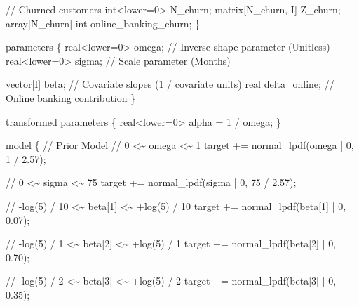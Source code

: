 \documentclass[
  letterpaper,
  DIV=11,
  numbers=noendperiod]{scrartcl}
\newenvironment{Shaded}{\begin{snugshade}}{\end{snugshade}}
\newcommand{\CommentTok}[1]{\textcolor[rgb]{0.37,0.37,0.37}{#1}}
\newcommand{\DataTypeTok}[1]{\textcolor[rgb]{0.68,0.00,0.00}{#1}}
\newcommand{\DecValTok}[1]{\textcolor[rgb]{0.68,0.00,0.00}{#1}}
\newcommand{\FloatTok}[1]{\textcolor[rgb]{0.68,0.00,0.00}{#1}}
\newcommand{\KeywordTok}[1]{\textcolor[rgb]{0.00,0.23,0.31}{#1}}
\newcommand{\NormalTok}[1]{\textcolor[rgb]{0.00,0.23,0.31}{#1}}
\begin{document}
\begin{codelisting}
\begin{Shaded}
\begin{Highlighting}[]
  \CommentTok{// Churned customers}
  \DataTypeTok{int}\NormalTok{\textless{}}\KeywordTok{lower}\NormalTok{=}\DecValTok{0}\NormalTok{\textgreater{} N\_churn;}
  \DataTypeTok{matrix}\NormalTok{[N\_churn, I] Z\_churn;}
  \DataTypeTok{array}\NormalTok{[N\_churn] }\DataTypeTok{int}\NormalTok{ online\_banking\_churn;}
\NormalTok{\}}

\KeywordTok{parameters}\NormalTok{ \{}
  \DataTypeTok{real}\NormalTok{\textless{}}\KeywordTok{lower}\NormalTok{=}\DecValTok{0}\NormalTok{\textgreater{} omega; }\CommentTok{// Inverse shape parameter (Unitless)}
  \DataTypeTok{real}\NormalTok{\textless{}}\KeywordTok{lower}\NormalTok{=}\DecValTok{0}\NormalTok{\textgreater{} sigma; }\CommentTok{// Scale parameter (Months)}

  \DataTypeTok{vector}\NormalTok{[I] beta;    }\CommentTok{// Covariate slopes (1 / covariate units)}
  \DataTypeTok{real}\NormalTok{ delta\_online; }\CommentTok{// Online banking contribution}
\NormalTok{\}}

\KeywordTok{transformed parameters}\NormalTok{ \{}
  \DataTypeTok{real}\NormalTok{\textless{}}\KeywordTok{lower}\NormalTok{=}\DecValTok{0}\NormalTok{\textgreater{} alpha = }\DecValTok{1}\NormalTok{ / omega;}
\NormalTok{\}}

\KeywordTok{model}\NormalTok{ \{}
  \CommentTok{// Prior Model}
  \CommentTok{// 0 \textless{}\textasciitilde{} omega \textless{}\textasciitilde{} 1}
  \KeywordTok{target +=}\NormalTok{ normal\_lpdf(omega | }\DecValTok{0}\NormalTok{, }\DecValTok{1}\NormalTok{ / }\FloatTok{2.57}\NormalTok{);}

  \CommentTok{// 0 \textless{}\textasciitilde{} sigma \textless{}\textasciitilde{} 75}
  \KeywordTok{target +=}\NormalTok{ normal\_lpdf(sigma | }\DecValTok{0}\NormalTok{, }\DecValTok{75}\NormalTok{ / }\FloatTok{2.57}\NormalTok{);}

  \CommentTok{// {-}log(5) / 10 \textless{}\textasciitilde{} beta[1] \textless{}\textasciitilde{} +log(5) / 10}
  \KeywordTok{target +=}\NormalTok{ normal\_lpdf(beta[}\DecValTok{1}\NormalTok{] | }\DecValTok{0}\NormalTok{, }\FloatTok{0.07}\NormalTok{);}

  \CommentTok{// {-}log(5) / 1 \textless{}\textasciitilde{} beta[2] \textless{}\textasciitilde{} +log(5) / 1}
  \KeywordTok{target +=}\NormalTok{ normal\_lpdf(beta[}\DecValTok{2}\NormalTok{] | }\DecValTok{0}\NormalTok{, }\FloatTok{0.70}\NormalTok{);}

  \CommentTok{// {-}log(5) / 2 \textless{}\textasciitilde{} beta[3] \textless{}\textasciitilde{} +log(5) / 2}
  \KeywordTok{target +=}\NormalTok{ normal\_lpdf(beta[}\DecValTok{3}\NormalTok{] | }\DecValTok{0}\NormalTok{, }\FloatTok{0.35}\NormalTok{);}


\end{Highlighting}
\end{Shaded}
\end{codelisting}
\end{document}
